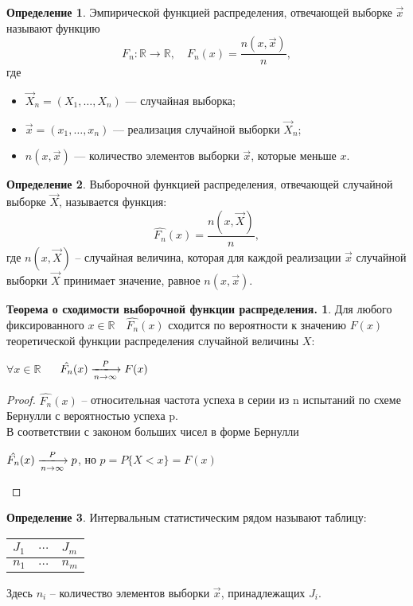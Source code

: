 \documentclass[a4paper, 12pt]{article}
\theoremstyle{definition}
\newtheorem{definition}{Определение}[section]
\theoremstyle{leads}
\theoremstyle{example}
\begin{document}
\begin{definition}
	Эмпирической функцией распределения, отвечающей выборке $\vec{x}$ называют функцию
	\begin{displaymath}
	F_n\colon \mathbb{R} \to \mathbb{R}, \quad F_n(x) = \frac{n(x, \vec{x})}{n}, 
	\end{displaymath}
	где 
	\begin{itemize}
		\item $\vec{X}_n = (X_1, \ldots, X_n)$ --- случайная выборка;
		\item $\vec{x} = (x_1, \dots, x_n)$ --- реализация случайной выборки $\vec{X}_n$;
		\item $n(x, \vec{x})$ --- количество элементов выборки $\vec{x}$, которые меньше $x$.
	\end{itemize}
\end{definition}
\begin{definition}
	Выборочной функцией распределения, отвечающей случайной выборке $\vec{X}$, называется функция:
	\begin{displaymath}
		\hat{F_n}(x) = \frac{n(x, \vec{X})}{n},  
	\end{displaymath}
	где $n(x, \vec{X})$ -- случайная величина, которая для каждой реализации $\vec{x}$ случайной выборки $\vec{X}$ принимает значение, равное $n(x, \vec{x})$. 
\end{definition}

\newtheorem*{sxod2}{Теорема о сходимости выборочной функции распределения.}
\begin{sxod2}
	Для любого фиксированного $x \in \mathbb{R} \quad \hat{F_n}(x)$ сходится по вероятности к значению $F(x)$ теоретической функции распределения случайной величины $X$:
	\begin{center}
		\centering
		$\forall x \in \mathbb{R}$ $\quad$ $\hat{F_n}(x) \xlongrightarrow[n \rightarrow \infty]{P} F(x)$
	\end{center}
\end{sxod2}
\begin{proof}
	$\hat{F_n}(x)$ -- относительная частота успеха в серии из n испытаний по схеме Бернулли с вероятностью успеха p.\\
	В соответствии с законом больших чисел в форме Бернулли  
	\begin{center}
		\centering
		$\hat{F_n}(x) \xlongrightarrow[n \rightarrow \infty]{P} p$, но $p = P\{X < x\} = F(x)$
	\end{center}
\end{proof}

\begin{definition}
	Интервальным статистическим рядом называют таблицу:
	\begin{center}
	\centering
	    \begin{tabular}{|l|l|l|}
		\hline
		$J_1$ & $\dots$ & $J_m$\\ \hline
		$n_1$ & $\dots$ & $n_m$\\ \hline 
	    \end{tabular}
    \end{center}
Здесь $n_i$ -- количество элементов выборки $\vec{x}$, принадлежащих $J_i$.
\end{definition}
\end{document}
